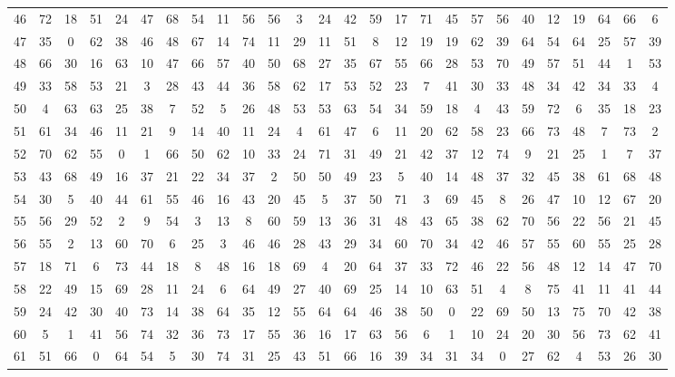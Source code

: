 \begin{table}
\begin{tabular}{c c c c c c c c c c c c c c c c c c c c c c c c c c }
46 & 72 & 18 & 51 & 24 & 47 & 68 & 54 & 11 & 56 & 56 & 3 & 24 & 42 & 59 & 17 & 71 & 45 & 57 & 56 & 40 & 12 & 19 & 64 & 66 & 6 \\
47 & 35 & 0 & 62 & 38 & 46 & 48 & 67 & 14 & 74 & 11 & 29 & 11 & 51 & 8 & 12 & 19 & 19 & 62 & 39 & 64 & 54 & 64 & 25 & 57 & 39 \\
48 & 66 & 30 & 16 & 63 & 10 & 47 & 66 & 57 & 40 & 50 & 68 & 27 & 35 & 67 & 55 & 66 & 28 & 53 & 70 & 49 & 57 & 51 & 44 & 1 & 53 \\
49 & 33 & 58 & 53 & 21 & 3 & 28 & 43 & 44 & 36 & 58 & 62 & 17 & 53 & 52 & 23 & 7 & 41 & 30 & 33 & 48 & 34 & 42 & 34 & 33 & 4 \\
50 & 4 & 63 & 63 & 25 & 38 & 7 & 52 & 5 & 26 & 48 & 53 & 53 & 63 & 54 & 34 & 59 & 18 & 4 & 43 & 59 & 72 & 6 & 35 & 18 & 23 \\
51 & 61 & 34 & 46 & 11 & 21 & 9 & 14 & 40 & 11 & 24 & 4 & 61 & 47 & 6 & 11 & 20 & 62 & 58 & 23 & 66 & 73 & 48 & 7 & 73 & 2 \\
52 & 70 & 62 & 55 & 0 & 1 & 66 & 50 & 62 & 10 & 33 & 24 & 71 & 31 & 49 & 21 & 42 & 37 & 12 & 74 & 9 & 21 & 25 & 1 & 7 & 37 \\
53 & 43 & 68 & 49 & 16 & 37 & 21 & 22 & 34 & 37 & 2 & 50 & 50 & 49 & 23 & 5 & 40 & 14 & 48 & 37 & 32 & 45 & 38 & 61 & 68 & 48 \\
54 & 30 & 5 & 40 & 44 & 61 & 55 & 46 & 16 & 43 & 20 & 45 & 5 & 37 & 50 & 71 & 3 & 69 & 45 & 8 & 26 & 47 & 10 & 12 & 67 & 20 \\
55 & 56 & 29 & 52 & 2 & 9 & 54 & 3 & 13 & 8 & 60 & 59 & 13 & 36 & 31 & 48 & 43 & 65 & 38 & 62 & 70 & 56 & 22 & 56 & 21 & 45 \\
56 & 55 & 2 & 13 & 60 & 70 & 6 & 25 & 3 & 46 & 46 & 28 & 43 & 29 & 34 & 60 & 70 & 34 & 42 & 46 & 57 & 55 & 60 & 55 & 25 & 28 \\
57 & 18 & 71 & 6 & 73 & 44 & 18 & 8 & 48 & 16 & 18 & 69 & 4 & 20 & 64 & 37 & 33 & 72 & 46 & 22 & 56 & 48 & 12 & 14 & 47 & 70 \\
58 & 22 & 49 & 15 & 69 & 28 & 11 & 24 & 6 & 64 & 49 & 27 & 40 & 69 & 25 & 14 & 10 & 63 & 51 & 4 & 8 & 75 & 41 & 11 & 41 & 44 \\
59 & 24 & 42 & 30 & 40 & 73 & 14 & 38 & 64 & 35 & 12 & 55 & 64 & 64 & 46 & 38 & 50 & 0 & 22 & 69 & 50 & 13 & 75 & 70 & 42 & 38 \\
60 & 5 & 1 & 41 & 56 & 74 & 32 & 36 & 73 & 17 & 55 & 36 & 16 & 17 & 63 & 56 & 6 & 1 & 10 & 24 & 20 & 30 & 56 & 73 & 62 & 41 \\
61 & 51 & 66 & 0 & 64 & 54 & 5 & 30 & 74 & 31 & 25 & 43 & 51 & 66 & 16 & 39 & 34 & 31 & 34 & 0 & 27 & 62 & 4 & 53 & 26 & 30 \\

\end{tabular}
\end{table}
